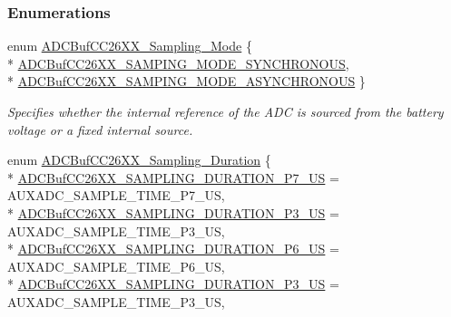 \subsubsection*{Enumerations}
\begin{DoxyCompactItemize}
\item 
enum \hyperlink{_a_d_c_buf_c_c26_x_x_8h_a816f299f98f8fc3cc1124cda74a18d10}{A\+D\+C\+Buf\+C\+C26\+X\+X\+\_\+\+Sampling\+\_\+\+Mode} \{ \\*
\hyperlink{_a_d_c_buf_c_c26_x_x_8h_a816f299f98f8fc3cc1124cda74a18d10a946b45558c94c6f3ade872941a9a3e8a}{A\+D\+C\+Buf\+C\+C26\+X\+X\+\_\+\+S\+A\+M\+P\+I\+N\+G\+\_\+\+M\+O\+D\+E\+\_\+\+S\+Y\+N\+C\+H\+R\+O\+N\+O\+U\+S}, 
\\*
\hyperlink{_a_d_c_buf_c_c26_x_x_8h_a816f299f98f8fc3cc1124cda74a18d10a528cdd3ff0e276e7fc85cc6b116af432}{A\+D\+C\+Buf\+C\+C26\+X\+X\+\_\+\+S\+A\+M\+P\+I\+N\+G\+\_\+\+M\+O\+D\+E\+\_\+\+A\+S\+Y\+N\+C\+H\+R\+O\+N\+O\+U\+S}
 \}
\begin{DoxyCompactList}\small\item\em Specifies whether the internal reference of the A\+D\+C is sourced from the battery voltage or a fixed internal source. \end{DoxyCompactList}\item 
enum \hyperlink{_a_d_c_buf_c_c26_x_x_8h_a4a95bf383dea0206b6708496a034a9fb}{A\+D\+C\+Buf\+C\+C26\+X\+X\+\_\+\+Sampling\+\_\+\+Duration} \{ \\*
\hyperlink{_a_d_c_buf_c_c26_x_x_8h_a4a95bf383dea0206b6708496a034a9fbacd4d4af4fd7304ce2184fa9a22600a22}{A\+D\+C\+Buf\+C\+C26\+X\+X\+\_\+\+S\+A\+M\+P\+L\+I\+N\+G\+\_\+\+D\+U\+R\+A\+T\+I\+O\+N\+\_\+P7\+\_\+\+U\+S} = A\+U\+X\+A\+D\+C\+\_\+\+S\+A\+M\+P\+L\+E\+\_\+\+T\+I\+M\+E\+\_\+P7\+\_\+\+U\+S, 
\\*
\hyperlink{_a_d_c_buf_c_c26_x_x_8h_a4a95bf383dea0206b6708496a034a9fba4164b576bef7b70e1a3f69eec57a6f62}{A\+D\+C\+Buf\+C\+C26\+X\+X\+\_\+\+S\+A\+M\+P\+L\+I\+N\+G\+\_\+\+D\+U\+R\+A\+T\+I\+O\+N\+\_\+P3\+\_\+\+U\+S} = A\+U\+X\+A\+D\+C\+\_\+\+S\+A\+M\+P\+L\+E\+\_\+\+T\+I\+M\+E\+\_\+P3\+\_\+\+U\+S, 
\\*
\hyperlink{_a_d_c_buf_c_c26_x_x_8h_a4a95bf383dea0206b6708496a034a9fba49ca33f11fcff33041eb0cbc19a089b4}{A\+D\+C\+Buf\+C\+C26\+X\+X\+\_\+\+S\+A\+M\+P\+L\+I\+N\+G\+\_\+\+D\+U\+R\+A\+T\+I\+O\+N\+\_\+P6\+\_\+\+U\+S} = A\+U\+X\+A\+D\+C\+\_\+\+S\+A\+M\+P\+L\+E\+\_\+\+T\+I\+M\+E\+\_\+P6\+\_\+\+U\+S, 
\\*
\hyperlink{_a_d_c_buf_c_c26_x_x_8h_a4a95bf383dea0206b6708496a034a9fba0156bc1aa641d10df8a820395f7193bf}{A\+D\+C\+Buf\+C\+C26\+X\+X\+\_\+\+S\+A\+M\+P\+L\+I\+N\+G\+\_\+\+D\+U\+R\+A\+T\+I\+O\+N\+\_\+P3\+\_\+\+U\+S} = A\+U\+X\+A\+D\+C\+\_\+\+S\+A\+M\+P\+L\+E\+\_\+\+T\+I\+M\+E\+\_\+P3\+\_\+\+U\+S, 

\end{DoxyCompactItemize}
